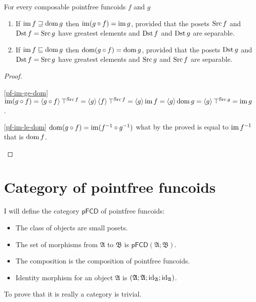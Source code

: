 \begin{prop}
For every composable pointfree funcoids $f$ and $g$
\begin{enumerate}
\item \label{pf-im-ge-dom}If $\operatorname{im} f\sqsupseteq\operatorname{dom} g$ then $\operatorname{im}(g\circ f)=\operatorname{im} g$, provided that
the posets $\operatorname{Src} f$ and $\operatorname{Dst} f=\operatorname{Src} g$ have greatest elements and $\operatorname{Dst} f$
and $\operatorname{Dst} g$ are separable.
\item \label{pf-im-le-dom}If $\operatorname{im} f\sqsubseteq\operatorname{dom} g$ then $\operatorname{dom}(g\circ f)=\operatorname{dom} g$, provided that
the posets $\operatorname{Dst} g$ and $\operatorname{Dst} f=\operatorname{Src} g$ have greatest elements and $\operatorname{Src} g$
and $\operatorname{Src} f$ are separable.
\end{enumerate}
\end{prop}
\begin{proof}
~
\begin{widedisorder}
\item [{\ref{pf-im-ge-dom}}] $\operatorname{im}(g\circ f)=\left\langle g\circ f\right\rangle\top^{\operatorname{Src} f}=\left\langle g\right\rangle\left\langle f\right\rangle\top^{\operatorname{Src} f}=\left\langle g\right\rangle\operatorname{im} f=\left\langle g\right\rangle\operatorname{dom} g=\left\langle g\right\rangle\top^{\operatorname{Src} g}=\operatorname{im} g$.
\item [{\ref{pf-im-le-dom}}] $\operatorname{dom}(g\circ f)=\operatorname{im}(f^{-1}\circ g^{-1})$
what by the proved is equal to $\operatorname{im} f^{-1}$ that is $\operatorname{dom} f$.
\end{widedisorder}
\end{proof}

\section{Category of pointfree funcoids}

I will define the category
$\mathsf{pFCD}$ of pointfree funcoids:
\begin{itemize}
\item The class of objects are small posets.
\item The set of morphisms from $\mathfrak{A}$ to $\mathfrak{B}$ is $\mathsf{pFCD}(\mathfrak{A};\mathfrak{B})$.
\item The composition is the composition of pointfree funcoids.
\item Identity morphism for an object $\mathfrak{A}$ is $(\mathfrak{A};\mathfrak{A};\operatorname{id}_{\mathfrak{A}};\operatorname{id}_{\mathfrak{A}})$.
\end{itemize}
To prove that it is really a category is trivial.

